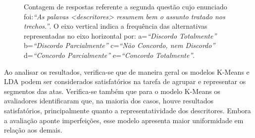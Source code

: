 \begin{figure}[!h] \centering     %

	\caption{Contagem de respostas referente a segunda questão cujo enunciado foi:\textit{``As palavas <descritores> resumem bem o assunto tratado nos trechos.''}. O eixo vertical indica a frequência das alternativas representadas no eixo horizontal por:
		a=\textit{``Discordo Totalmente''}
		b=\textit{``Discordo Parcialmente''}
		c=\textit{``Não Concordo, nem Discordo''}
		d=\textit{``Concordo Parcialmente''}
		e=\textit{``Concordo Totalmente''}.
	}
	\label{fig:Q2}
\end{figure}


Ao analisar os resultados, verifica-se que de maneira geral os modelos K-Means e LDA podem ser considerados satisfatórios na tarefa de agrupar e representar os segmentos das atas.
Verifica-se também que para o modelo K-Means os avaliadores identificaram que, na maioria dos casos, houve resultados satisfatórios, principalmente quanto a representatividade dos descritores. Embora a avaliação aponte imperfeições, esse modelo apresenta maior uniformidade em relação aos demais.


